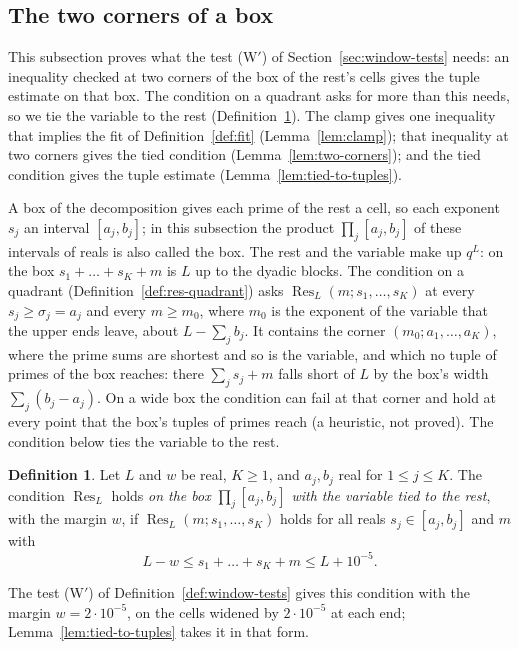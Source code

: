 \documentclass[11pt]{article}
\theoremstyle{definition}
\newtheorem{definition}[theorem]{Definition}
\begin{document}
\subsection{The two corners of a box}\label{sec:corners}

This subsection proves what the test (W$'$) of Section~\ref{sec:window-tests} needs: an inequality checked at two
corners of the box of the rest's cells gives the tuple estimate on that box. The condition on a quadrant asks for more
than this needs, so we tie the variable to the rest (Definition~\ref{def:res-tied}). The clamp gives one inequality
that implies the fit of Definition~\ref{def:fit} (Lemma~\ref{lem:clamp}); that inequality at two corners gives the
tied condition (Lemma~\ref{lem:two-corners}); and the tied condition gives the tuple estimate
(Lemma~\ref{lem:tied-to-tuples}).

A box of the decomposition gives each prime of the rest a cell, so each exponent $s_j$ an interval $[a_j, b_j]$; in
this subsection the product $\prod_j [a_j, b_j]$ of these intervals of reals is also called the box. The rest and the
variable make up $q^L$: on the box $s_1 + \dots + s_K + m$ is $L$ up to the dyadic blocks. The
condition on a quadrant (Definition~\ref{def:res-quadrant}) asks $\operatorname{Res}_L(m; s_1, \dots, s_K)$ at every
$s_j
\ge \sigma_j = a_j$ and every $m \ge m_0$, where $m_0$ is the exponent of the variable that the upper ends leave,
about $L - \sum_j
b_j$. It contains the corner $(m_0; a_1, \dots, a_K)$, where the prime sums are shortest and so is the variable, and
which no tuple of primes of the box reaches: there $\sum_j s_j + m$ falls short of $L$ by the box's width $\sum_j
(b_j - a_j)$. On a wide box the condition can fail at that corner and hold at every point that the box's tuples of
primes reach (a
heuristic, not proved). The condition below ties the variable to the rest.

\begin{definition}\label{def:res-tied}
Let $L$ and $w$ be real, $K \ge 1$, and $a_j, b_j$ real for $1 \le j \le K$. The condition $\operatorname{Res}_L$ holds
\emph{on the box $\prod_j [a_j, b_j]$ with the variable tied to the rest}, with the margin $w$, if
$\operatorname{Res}_L(m; s_1, \dots, s_K)$ holds for all reals $s_j \in [a_j, b_j]$ and $m$ with
\[
  L - w \le s_1 + \dots + s_K + m \le L + 10^{-5}.
\]
\end{definition}

The test (W$'$) of Definition~\ref{def:window-tests} gives this condition with the margin $w = 2 \cdot 10^{-5}$, on
the cells widened by $2 \cdot 10^{-5}$ at each end; Lemma~\ref{lem:tied-to-tuples} takes it in that form.
\end{document}

